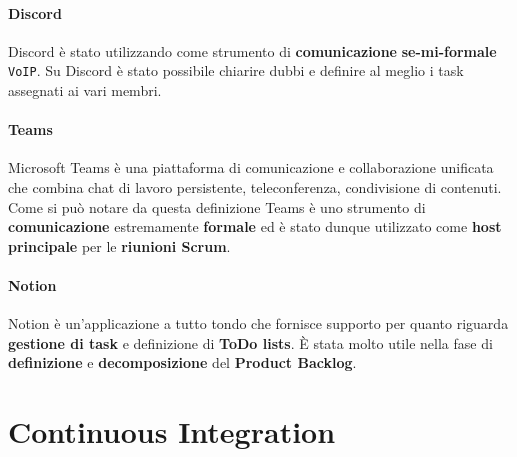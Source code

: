 \paragraph{Discord}
Discord è stato utilizzando come strumento di \textbf{comunicazione} \textbf{se-mi-formale} \texttt{VoIP}. Su Discord è stato possibile chiarire dubbi e definire al meglio i task assegnati ai vari membri.

\paragraph{Teams}
Microsoft Teams è una piattaforma di comunicazione e collaborazione unificata che combina chat di lavoro persistente, teleconferenza, condivisione di contenuti. Come si può notare da questa definizione Teams è uno strumento di \textbf{comunicazione} estremamente \textbf{formale} ed è stato dunque utilizzato come \textbf{host principale} per le \textbf{riunioni Scrum}.

\paragraph{Notion}
Notion è un'applicazione a tutto tondo che fornisce supporto per quanto riguarda \textbf{gestione di task} e definizione di \textbf{ToDo lists}. È stata molto utile nella fase di \textbf{definizione} e \textbf{decomposizione} del \textbf{Product Backlog}.

\section{Continuous Integration}